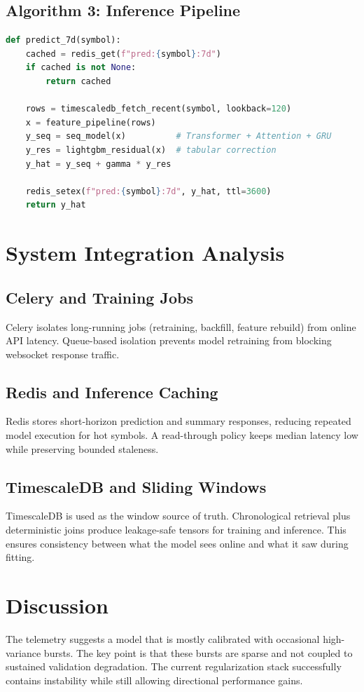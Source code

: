 \documentclass{article}
\begin{document}
\subsection{Algorithm 3: Inference Pipeline}
\begin{lstlisting}[language=Python,caption={Pseudo-code for online inference path},label={lst:algo-infer}]
def predict_7d(symbol):
    cached = redis_get(f"pred:{symbol}:7d")
    if cached is not None:
        return cached

    rows = timescaledb_fetch_recent(symbol, lookback=120)
    x = feature_pipeline(rows)
    y_seq = seq_model(x)          # Transformer + Attention + GRU
    y_res = lightgbm_residual(x)  # tabular correction
    y_hat = y_seq + gamma * y_res

    redis_setex(f"pred:{symbol}:7d", y_hat, ttl=3600)
    return y_hat
\end{lstlisting}

\section{System Integration Analysis}
\subsection{Celery and Training Jobs}
Celery isolates long-running jobs (retraining, backfill, feature rebuild) from online API latency. Queue-based isolation prevents model retraining from blocking websocket response traffic.

\subsection{Redis and Inference Caching}
Redis stores short-horizon prediction and summary responses, reducing repeated model execution for hot symbols. A read-through policy keeps median latency low while preserving bounded staleness.

\subsection{TimescaleDB and Sliding Windows}
TimescaleDB is used as the window source of truth. Chronological retrieval plus deterministic joins produce leakage-safe tensors for training and inference. This ensures consistency between what the model sees online and what it saw during fitting.

\section{Discussion}
The telemetry suggests a model that is mostly calibrated with occasional high-variance bursts. The key point is that these bursts are sparse and not coupled to sustained validation degradation. The current regularization stack successfully contains instability while still allowing directional performance gains.
\end{document}
